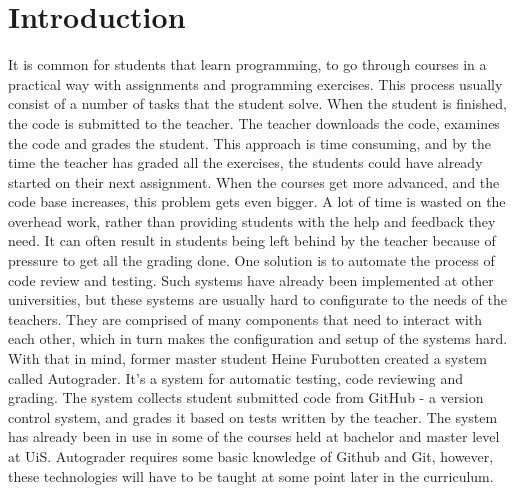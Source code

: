 \chapter*{Introduction}
It is common for students that learn programming, to go through courses in a practical way with assignments and programming exercises. This process usually consist of a number of tasks that the student solve. When the student is finished, the code is submitted to the teacher. The teacher downloads the code, examines the code and grades the student. This approach is time consuming, and by the time the teacher has graded all the exercises, the students could have already started on their next assignment. When the courses get more advanced, and the code base increases, this problem gets even bigger. A lot of time is wasted on the overhead work, rather than providing students with the help and feedback they need. It can often result in students being left behind by the teacher because of pressure to get all the grading done. One solution is to automate the process of code review and testing. Such systems have already been implemented at other universities, but these systems are usually hard to configurate to the needs of the teachers. They are comprised of many components that need to interact with each other, which in turn makes the configuration and setup of the systems hard. With that in mind, former master student Heine Furubotten created a system called Autograder. It's a system for automatic testing, code reviewing and grading. The system collects student submitted code from GitHub - a version control system, and grades it based on tests written by the teacher. The system has already been in use in some of the courses held at bachelor and master level at UiS. Autograder requires some basic knowledge of Github and Git, however, these technologies will have to be taught at some point later in the curriculum.

